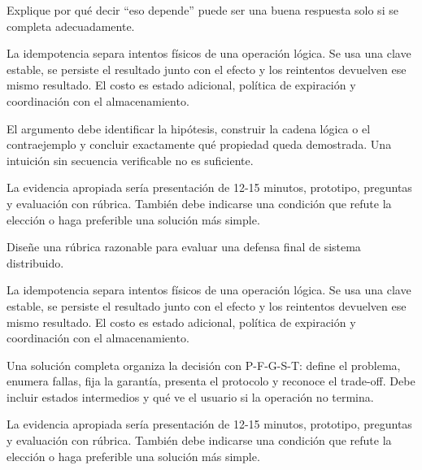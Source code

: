 \documentclass[variant=guia,cover=institutional,mode=screen]{ua-engineering-v6-article}
\begin{document}
\begin{uaexercise}
Explique por qué decir “eso depende” puede ser una buena respuesta solo si se completa adecuadamente.
\end{uaexercise}
\begin{uaanswer}
La idempotencia separa intentos físicos de una operación lógica. Se usa una clave estable, se persiste el resultado junto con el efecto y los reintentos devuelven ese mismo resultado. El costo es estado adicional, política de expiración y coordinación con el almacenamiento.

El argumento debe identificar la hipótesis, construir la cadena lógica o el contraejemplo y concluir exactamente qué propiedad queda demostrada. Una intuición sin secuencia verificable no es suficiente.

La evidencia apropiada sería presentación de 12-15 minutos, prototipo, preguntas y evaluación con rúbrica. También debe indicarse una condición que refute la elección o haga preferible una solución más simple.
\end{uaanswer}

\begin{uaexercise}
Diseñe una rúbrica razonable para evaluar una defensa final de sistema distribuido.
\end{uaexercise}
\begin{uaanswer}
La idempotencia separa intentos físicos de una operación lógica. Se usa una clave estable, se persiste el resultado junto con el efecto y los reintentos devuelven ese mismo resultado. El costo es estado adicional, política de expiración y coordinación con el almacenamiento.

Una solución completa organiza la decisión con P-F-G-S-T: define el problema, enumera fallas, fija la garantía, presenta el protocolo y reconoce el trade-off. Debe incluir estados intermedios y qué ve el usuario si la operación no termina.

La evidencia apropiada sería presentación de 12-15 minutos, prototipo, preguntas y evaluación con rúbrica. También debe indicarse una condición que refute la elección o haga preferible una solución más simple.
\end{uaanswer}
\end{document}
